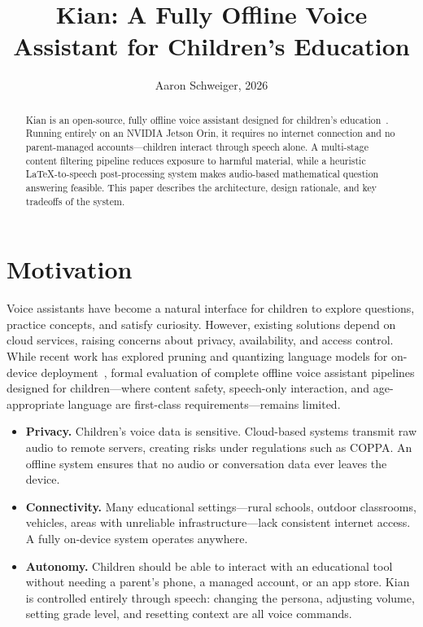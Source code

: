 \documentclass[11pt]{article}
\title{\textbf{Kian: A Fully Offline Voice Assistant for Children's Education}}
\author{Aaron Schweiger, 2026}
\date{\vspace{-2em}}
\begin{document}
\maketitle

\begin{abstract}
Kian is an open-source, fully offline voice assistant designed for children's education~\cite{kian2026}.
Running entirely on an NVIDIA Jetson Orin, it requires no internet connection and no parent-managed accounts---children interact through speech alone.
A multi-stage content filtering pipeline reduces exposure to harmful material, while a heuristic LaTeX-to-speech post-processing system makes audio-based mathematical question answering feasible.
This paper describes the architecture, design rationale, and key tradeoffs of the system.
\end{abstract}

\section{Motivation}

Voice assistants have become a natural interface for children to explore questions, practice concepts, and satisfy curiosity.
However, existing solutions depend on cloud services, raising concerns about privacy, availability, and access control.
While recent work has explored pruning and quantizing language models for on-device deployment~\cite{liu2024comparing},
formal evaluation of complete offline voice assistant pipelines designed for children---where content safety, speech-only interaction,
and age-appropriate language are first-class requirements---remains limited.

\begin{itemize}[nosep]
  \item \textbf{Privacy.}
    Children's voice data is sensitive.
    Cloud-based systems transmit raw audio to remote servers, creating risks under regulations such as COPPA.
    An offline system ensures that no audio or conversation data ever leaves the device.
  \item \textbf{Connectivity.}
    Many educational settings---rural schools, outdoor classrooms, vehicles, areas with unreliable infrastructure---lack consistent internet access.
    A fully on-device system operates anywhere.
  \item \textbf{Autonomy.}
    Children should be able to interact with an educational tool without needing a parent's phone, a managed account, or an app store.
    Kian is controlled entirely through speech: changing the persona, adjusting volume, setting grade level, and resetting context are all voice commands.
\end{itemize}
\end{document}
